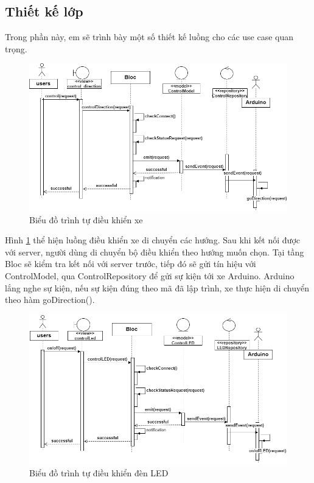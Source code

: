 \documentclass[../DoAn.tex]{subfiles}
\begin{document}
\subsection{Thiết kế lớp}
 Trong phần này, em sẽ trình bày một số thiết kế luồng cho các use case quan trọng.

 \begin{figure}[H]
    \centering
    \includegraphics[scale = 0.5]{Hinhve/sequence_dieu_khien_xe.png}
    \caption{Biểu đồ trình tự điều khiển xe}
    \label{fig:4.2.2.1}
\end{figure}

Hình \ref{fig:4.2.2.1} thể hiện luồng điều khiển xe di chuyển các hướng. Sau khi kết nối được với server, người dùng di chuyển bộ điều khiển theo hướng muốn chọn. Tại tầng Bloc sẽ kiểm tra kết nối với server trước, tiếp đó sẽ gửi tín hiệu với ControlModel, qua ControlRepository để gửi sự kiện tới xe Arduino. Arduino lắng nghe sự kiện, nếu sự kiện đúng theo mã đã lập trình, xe thực hiện di chuyển theo hàm goDirection().

 \begin{figure}[H]
    \centering
    \includegraphics[scale = 0.5]{Hinhve/sequence_dieu_khien_led.png}
    \caption{Biểu đồ trình tự điều khiển đèn LED}
    \label{fig:4.2.2.2}
\end{figure}
\end{document}
